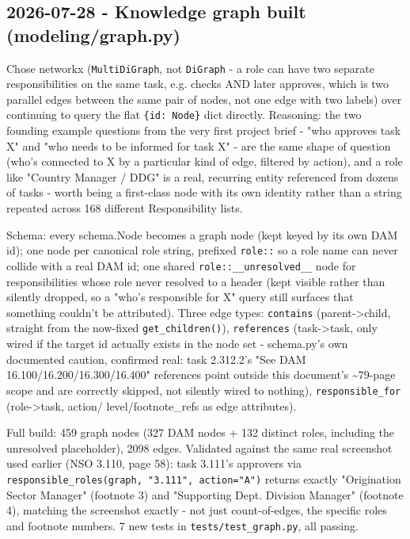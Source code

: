 \subsection*{2026-07-28 - Knowledge graph built (modeling/graph.py)}
Chose networkx (\texttt{MultiDiGraph}, not \texttt{DiGraph} - a role can have two separate responsibilities on the same task, e.g. checks AND later approves, which is two parallel edges between the same pair of nodes, not one edge with two labels) over continuing to query the flat \texttt{\{id: Node\}} dict directly. Reasoning: the two founding example questions from the very first project brief - "who approves task X" and "who needs to be informed for task X" - are the same shape of question (who's connected to X by a particular kind of edge, filtered by action), and a role like "Country Manager / DDG" is a real, recurring entity referenced from dozens of tasks - worth being a first-class node with its own identity rather than a string repeated across 168 different Responsibility lists.

Schema: every schema.Node becomes a graph node (kept keyed by its own DAM id); one node per canonical role string, prefixed \texttt{role::} so a role name can never collide with a real DAM id; one shared \texttt{role::\_\allowbreak{}\_\allowbreak{}unresolved\_\allowbreak{}\_\allowbreak{}} node for responsibilities whose role never resolved to a header (kept visible rather than silently dropped, so a "who's responsible for X" query still surfaces that something couldn't be attributed). Three edge types: \texttt{contains} (parent->child, straight from the now-fixed \texttt{get\_\allowbreak{}children()}), \texttt{references} (task->task, only wired if the target id actually exists in the node set - schema.py's own documented caution, confirmed real: task 2.312.2's "See DAM 16.100/16.200/16.300/16.400" references point outside this document's \textasciitilde{}79-page scope and are correctly skipped, not silently wired to nothing), \texttt{responsible\_\allowbreak{}for} (role->task, action/ level/footnote\_refs as edge attributes).

Full build: 459 graph nodes (327 DAM nodes + 132 distinct roles, including the unresolved placeholder), 2098 edges. Validated against the same real screenshot used earlier (NSO 3.110, page 58): task 3.111's approvers via \texttt{responsible\_\allowbreak{}roles(graph, "3.111", action="A")} returns exactly "Origination Sector Manager" (footnote 3) and "Supporting Dept. Division Manager" (footnote 4), matching the screenshot exactly - not just count-of-edges, the specific roles and footnote numbers. 7 new tests in \texttt{tests/\allowbreak{}test\_\allowbreak{}graph.py}, all passing.

